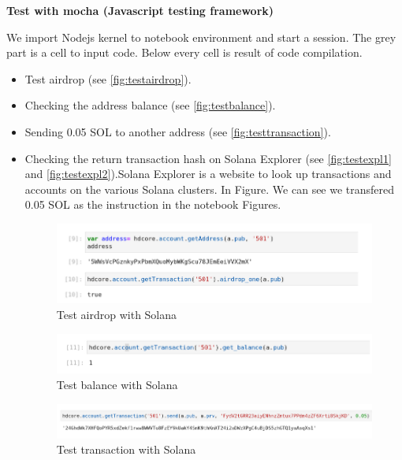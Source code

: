 \bigskip
{\textbf{Test with mocha (Javascript testing framework)}}
\bigskip

We import Nodejs kernel to notebook environment and start a session. The grey part is a cell to input code. Below every cell is result of code compilation.

\begin{itemize}
    \item Test airdrop (see \autoref{fig:testairdrop}).
    \item Checking the address balance (see \autoref{fig:testbalance}).
    \item Sending 0.05 SOL to another address (see \autoref{fig:testtransaction}).
    \item Checking the return transaction hash on Solana Explorer (see \autoref{fig:testexpl1} and \autoref{fig:testexpl2}).Solana Explorer is a website to look up transactions and accounts on the various Solana clusters. In Figure. We can see we transfered 0.05 SOL as the instruction in the notebook Figures.

    \begin{figure}[ht!]
        \centering
        \includegraphics[width=1\textwidth]{images/testairdrop.png}
        \caption[Test airdrop with Solana]{Test airdrop with Solana}
        \label{fig:testairdrop}
    \end{figure}
    \begin{figure}[ht!]
        \centering
        \includegraphics[width=1\textwidth]{images/testgetbalance.png}
        \caption[Test balance with Solana]{Test balance with Solana}
        \label{fig:testbalance}
    \end{figure}
    \begin{figure}[ht!]
        \centering
        \includegraphics[width=1\textwidth]{images/testtransaction.png}
        \caption[Test transaction with Solana]{Test transaction with Solana}
        \label{fig:testtransaction}
    \end{figure}


\end{itemize}
